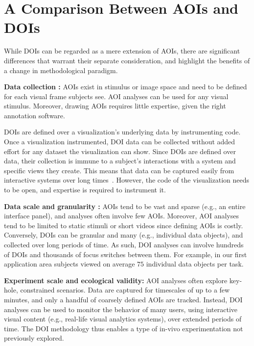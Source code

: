 \section{A Comparison Between AOIs and DOIs}
\label{sec:AOIvsDOI}


While DOIs can be regarded as a mere extension of AOIs, there are significant differences that warrant their separate consideration, and highlight the benefits of a change in methodological paradigm.

\noindent \textbf{Data collection :} AOIs exist in stimulus or image space and need to be defined for each visual frame subjects see. AOI analyses can be used for any visual stimulus. Moreover, drawing AOIs requires little expertise, given the right annotation software. 

DOIs are defined over a visualization's underlying data by instrumenting code. Once a visualization instrumented, DOI data can be collected without added effort for any dataset the visualization can show. Since DOIs are defined over data, their collection is immune to a subject's interactions with a system and specific views they create. This means that data can be captured easily from interactive systems over long times~\cite{Ala16}. However, the code of the visualization needs to be open, and expertise is required to instrument it.

\vspace{2mm}

\noindent \textbf{Data scale and granularity :} AOIs tend to be vast and sparse (e.g., an entire interface panel), and analyses often involve few AOIs. Moreover, AOI analyses tend to be limited to static stimuli or short videos since defining AOIs is costly. Conversely, DOIs can be granular and many (e.g., individual data objects), and collected over long periods of time. As such, DOI analyses can involve hundreds of DOIs and thousands of focus switches between them. For example, in our first application area subjects viewed on average $75$ individual data objects per task.

\vspace{2mm}

\noindent \textbf{Experiment scale and ecological validity:} AOI analyses often explore key-hole, constrained scenarios. Data are captured for timescales of up to a few minutes, and only a handful of coarsely defined AOIs are tracked. Instead, DOI analyses can be used to monitor the behavior of many users, using interactive visual content (e.g., real-life visual analytics systems), over extended periods of time. The DOI methodology thus enables a type of in-vivo experimentation not previously explored.

